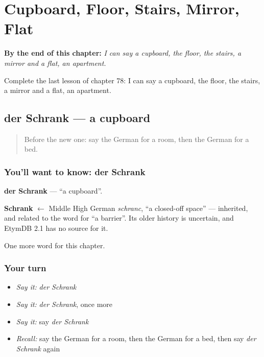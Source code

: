 
\chapter{Cupboard, Floor, Stairs, Mirror, Flat}
\label{ch:ge-cupboard-floor-stairs-mirror-flat}

\begin{chapteropening}
\textbf{By the end of this chapter:} \emph{I can say a cupboard, the floor, the stairs, a mirror and a flat, an apartment.}

Complete the last lesson of chapter 78: I can say a cupboard, the floor, the stairs, a mirror and a flat, an apartment.
\end{chapteropening}

\section[der Schrank]{der Schrank — a cupboard}

\label{lesson:GE-C78-schrank}



\begin{quote}
Before the new one: say the German for a room, then the German for a bed.
\end{quote}

\subsection*{You'll want to know: der Schrank}
\textbf{der Schrank} — \textquotedblleft{}a cupboard\textquotedblright{}.

\begin{cousinweb}
\textbf{Schrank} $\leftarrow$ Middle High German \emph{schranc}, \textquotedblleft{}a closed-off space\textquotedblright{} — inherited, and related to the word for \textquotedblleft{}a barrier\textquotedblright{}. Its older history is uncertain, and EtymDB 2.1 has no source for it.
\end{cousinweb}

\begin{grammarlens}[title={What you've built}]
One more word for this chapter.
\end{grammarlens}

\subsection*{Your turn}
\begin{itemize}
\raggedright
  \item \emph{Say it:} \emph{der Schrank}
  \item \emph{Say it:} \emph{der Schrank}, once more
  \item \emph{Say it:} say \emph{der Schrank}
  \item \emph{Recall:} say the German for a room, then the German for a bed, then say \emph{der Schrank} again
\end{itemize}

